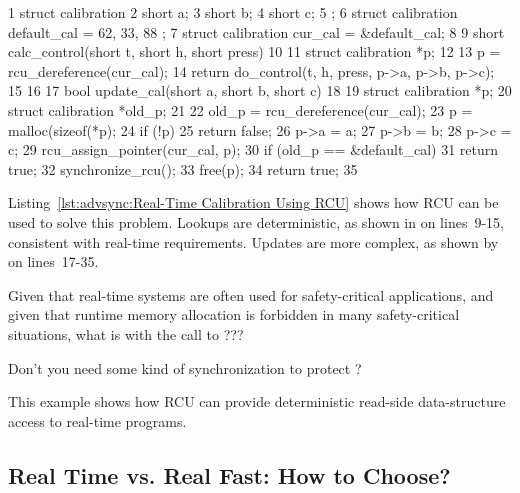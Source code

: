 \begin{listing}[tb]
{ \scriptsize
\begin{verbbox}
 1 struct calibration {
 2   short a;
 3   short b;
 4   short c;
 5 };
 6 struct calibration default_cal = { 62, 33, 88 };
 7 struct calibration cur_cal = &default_cal;
 8
 9 short calc_control(short t, short h, short press)
10 {
11   struct calibration *p;
12
13   p = rcu_dereference(cur_cal);
14   return do_control(t, h, press, p->a, p->b, p->c);
15 }
16
17 bool update_cal(short a, short b, short c)
18 {
19   struct calibration *p;
20   struct calibration *old_p;
21
22   old_p = rcu_dereference(cur_cal);
23   p = malloc(sizeof(*p);
24   if (!p)
25     return false;
26   p->a = a;
27   p->b = b;
28   p->c = c;
29   rcu_assign_pointer(cur_cal, p);
30   if (old_p == &default_cal)
31     return true;
32   synchronize_rcu();
33   free(p);
34   return true;
35 }
\end{verbbox}
}
\centering
\theverbbox
\caption{Real-Time Calibration Using RCU}
\label{lst:advsync:Real-Time Calibration Using RCU}
\end{listing}

Listing~\ref{lst:advsync:Real-Time Calibration Using RCU}
shows how RCU can be used to solve this problem.
Lookups are deterministic, as shown in 
on lines~9-15, consistent with real-time requirements.
Updates are more complex, as shown by 
on lines~17-35.

\QuickQuiz{}
	Given that real-time systems are often used for safety-critical
	applications, and given that runtime memory allocation is
	forbidden in many safety-critical situations, what is with
	the call to ???
 \QuickQuizEnd

\QuickQuiz{}
	Don't you need some kind of synchronization to protect
	?
 \QuickQuizEnd

This example shows how RCU can provide deterministic read-side
data-structure access to real-time programs.

\subsection{Real Time vs. Real Fast: How to Choose?}
\label{sec:advsync:Real Time vs. Real Fast: How to Choose?}


